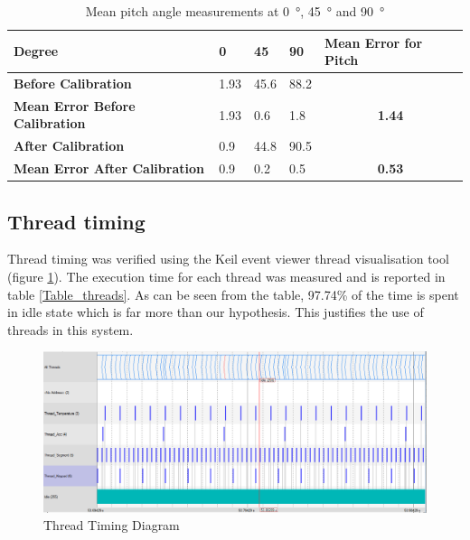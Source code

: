 \documentclass[12pt]{article}
\begin{document}
\begin{table}[!h]
\centering
\caption{Mean pitch angle measurements at \SI{0}{\degree}, \SI{45}{\degree} and \SI{90}{\degree}}
\label{Table_acc_pitch}
\begin{tabular}{lllll}
\hline
\textbf{Degree} & \textbf{0} & \textbf{45} & \textbf{90} & \textbf{Mean Error for Pitch}
\\ \hline
\textbf{Before Calibration} & 1.93 & 45.6 & 88.2
\\ \hline
\textbf{Mean Error Before Calibration} & 1.93 & 0.6 & 1.8 & \multicolumn{1}{c}{\textbf{1.44}}
\\ \hline
\textbf{After Calibration} & 0.9 & 44.8 & 90.5
\\ \hline
\textbf{Mean Error After Calibration} & 0.9 & 0.2 & 0.5 & \multicolumn{1}{c}{\textbf{0.53}}
\end{tabular}
\end{table}

\newpage

\subsection{Thread timing}
Thread timing was verified using the Keil event viewer thread visualisation tool (figure \ref{fig:threadstiming}). The execution time for each thread was measured and is reported in table \ref{Table_threads}. As can be seen from the table, 97.74\% of the time is spent in idle state which is far more than our hypothesis. This justifies the use of threads in this system.

\begin{figure}[!h]
 \centering
 \includegraphics[scale=0.50]{images/threads1.png}
 \caption{Thread Timing Diagram}
 \label{fig:threadstiming}
\end{figure}
\end{document}
